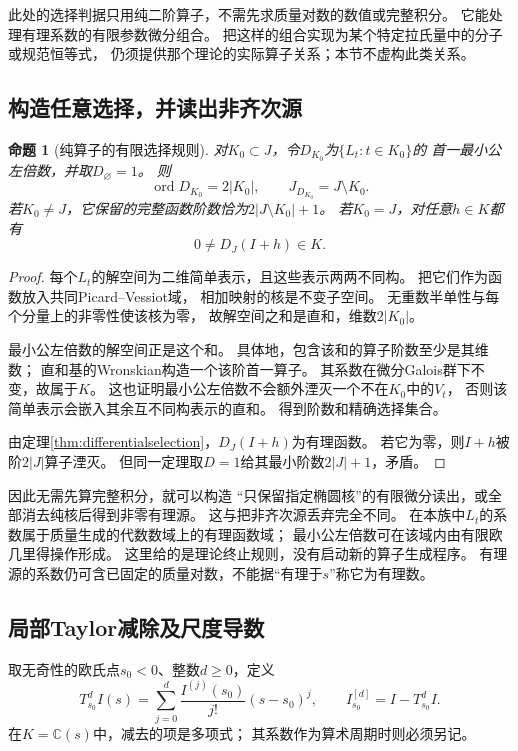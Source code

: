\documentclass[11pt,a4paper]{ctexart}
\theoremstyle{cnplain}\newtheorem{theorem}{定理}[section]
\newtheorem{proposition}[theorem]{命题}
\theoremstyle{definition}\newtheorem{definition}[theorem]{定义}
\theoremstyle{remark}\newtheorem{remark}[theorem]{注}
\begin{document}
此处的选择判据只用纯二阶算子，不需先求质量对数的数值或完整积分。
它能处理有理系数的有限参数微分组合。
把这样的组合实现为某个特定拉氏量中的分子或规范恒等式，
仍须提供那个理论的实际算子关系；本节不虚构此类关系。

\subsection{构造任意选择，并读出非齐次源}
\begin{proposition}[纯算子的有限选择规则]\label{prop:oreselectors}
对$K_0\subset J$，令$D_{K_0}$为$\{L_t:t\in K_0\}$的
首一最小公左倍数，并取$D_\varnothing=1$。
则
\[
 \operatorname{ord}D_{K_0}=2|K_0|,\qquad
 J_{D_{K_0}}=J\setminus K_0.
\]
若$K_0\ne J$，它保留的完整函数阶数恰为$2|J\setminus K_0|+1$。
若$K_0=J$，对任意$h\in K$都有
\begin{equation}\label{eq:nonzerosource}
 0\ne D_J(I+h)\in K .
\end{equation}
\end{proposition}
\begin{proof}
每个$L_t$的解空间为二维简单表示，且这些表示两两不同构。
把它们作为函数放入共同Picard--Vessiot域，
相加映射的核是不变子空间。
无重数半单性与每个分量上的非零性使该核为零，
故解空间之和是直和，维数$2|K_0|$。

最小公左倍数的解空间正是这个和。
具体地，包含该和的算子阶数至少是其维数；
直和基的Wronskian构造一个该阶首一算子。
其系数在微分Galois群下不变，故属于$K$。
这也证明最小公左倍数不会额外湮灭一个不在$K_0$中的$V_t$，
否则该简单表示会嵌入其余互不同构表示的直和。
得到阶数和精确选择集合。

由定理\ref{thm:differentialselection}，$D_J(I+h)$为有理函数。
若它为零，则$I+h$被阶$2|J|$算子湮灭。
但同一定理取$D=1$给其最小阶数$2|J|+1$，矛盾。
\end{proof}

因此无需先算完整积分，就可以构造
“只保留指定椭圆核”的有限微分读出，或全部消去纯核后得到非零有理源。
这与把非齐次源丢弃完全不同。
在本族中$L_t$的系数属于质量生成的代数数域上的有理函数域；
最小公左倍数可在该域内由有限欧几里得操作形成。
这里给的是理论终止规则，没有启动新的算子生成程序。
有理源的系数仍可含已固定的质量对数，不能据“有理于$s$”称它为有理数。

\subsection{局部Taylor减除及尺度导数}
取无奇性的欧氏点$s_0<0$、整数$d\ge0$，定义
\begin{equation}\label{eq:localtaylor}
 T_{s_0}^{d}I(s)=\sum_{j=0}^d
       \frac{I^{(j)}(s_0)}{j!}(s-s_0)^j,\qquad
 I^{[d]}_{s_0}=I-T_{s_0}^dI .
\end{equation}
在$K=\mathbb C(s)$中，减去的项是多项式；
其系数作为算术周期时则必须另记。
\end{document}
